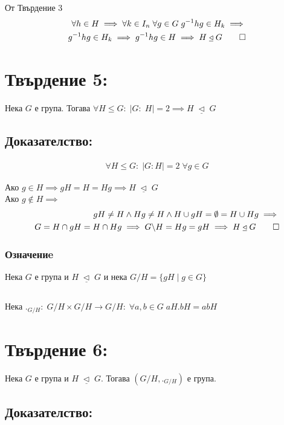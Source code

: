 \documentclass{article}
\newcommand{\NSG}{\; \underline{\triangleleft} \;}
\begin{document}
От Твърдение 3
\begin{align*}
\forall h \in H \implies \forall k \in I_n \; \forall g \in G \; g^{-1}hg \in H_k \implies \\
g^{-1}hg \in H_k \implies g^{-1}hg \in H \implies H \NSG G \qed
\end{align*}

\section*{Твърдение 5:}
Нека $G$ е група. Тогава $\forall H \leq G : \; |G : \; H| = 2 \implies H \NSG G$

\subsection*{Доказателство:}

\begin{align*}
	\forall H \leq G : \; |G : H| = 2 \; \forall g \in G
\end{align*}

Ако $g \in H \implies gH = H = Hg \implies H \NSG G$ \\
Ако $g \notin H \implies$
\begin{align*} gH \neq H \land Hg \neq H \land H \cup gH = \emptyset = H \cup Hg \implies \\
G = H \cap gH = H \cap Hg \implies G \backslash H = Hg = gH \implies H \NSG G \qed
\end{align*}

\subsubsection*{Означениe}
Нека $G$ е група и $H \NSG G$ и нека $G/H = \{gH \; | \; g \in G\}$

\subsection*{}
Нека $._{G/H} : \; G/H \times G/H \to G/H : \; \forall a, b \in G \; aH.bH = abH$

\section*{Твърдение 6:}
Нека $G$ е група и $H \NSG G$. Тогава $(G/H, ._{G/H})$ е група.

\subsection*{Доказателство:}
\end{document}
